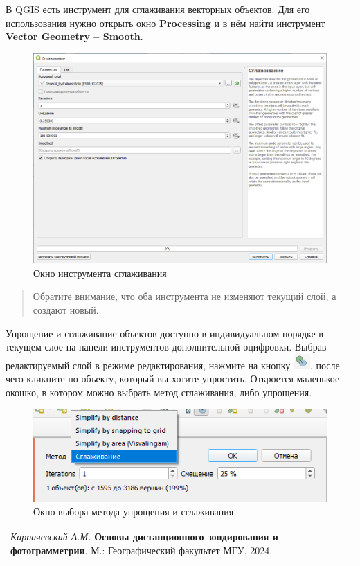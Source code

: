 \documentclass[
  12pt,
]{book}
\begin{document}
В QGIS есть инструмент для сглаживания векторных объектов. Для его использования нужно открыть окно \textbf{Processing} и в нём найти инструмент \textbf{Vector Geometry -- Smooth}.

\begin{figure}
\centering
\includegraphics{images/Ref19/Smooth.png}
\caption{Окно инструмента сглаживания}
\end{figure}

\begin{quote}
Обратите внимание, что оба инструмента не изменяют текущий слой, а создают новый.
\end{quote}

Упрощение и сглаживание объектов доступно в индивидуальном порядке в текущем слое на панели инструментов дополнительной оцифровки. Выбрав редактируемый слой в режиме редактирования, нажмите на кнопку \includegraphics{images/Ref19/Simplify_button.png}, после чего кликните по объекту, который вы хотите упростить. Откроется маленькое окошко, в котором можно выбрать метод сглаживания, либо упрощения.

\begin{figure}
\centering
\includegraphics{images/Ref19/Simplifying.png}
\caption{Окно выбора метода упрощения и сглаживания}
\end{figure}

\begin{longtable}[]{@{}l@{}}
\toprule\noalign{}
\endhead
\bottomrule\noalign{}
\endlastfoot
\emph{Карпачевский А.М.} \textbf{Основы дистанционного зондирования и фотограмметрии}. М.: Географический факультет МГУ, 2024. \\
\end{longtable}

  
\end{document}
